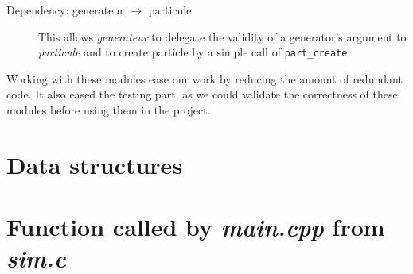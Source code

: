 \documentclass[a4paper]{article} %
\begin{document}
\begin{multicols*}{2}
\begin{description}
\item[Dependency: generateur $\rightarrow$ particule]
This allows \emph{generateur} to delegate the validity of a generator's argument to \emph{particule}
and to create particle by a simple call of \texttt{part\_create}
\end{description}

Working with these modules ease our work by reducing the amount of redundant code.
It also eased the testing part, as we could validate the correctness of these modules before using them in the project.

\section{Data structures}



\section{Function called by \emph{main.cpp} from \emph{sim.c}}

\label{lastpage}
\end{multicols*}
\end{document}
